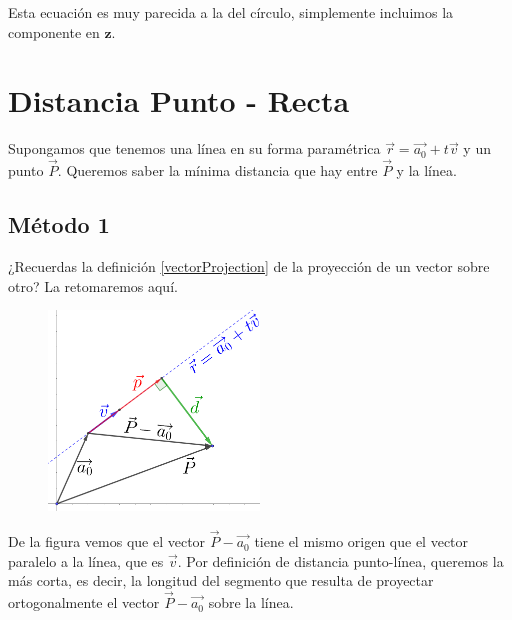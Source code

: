 \documentclass[12pt, fleqn]{report}                             %
\theoremstyle{break}                                            %
\newcommand{\lVec}[1]   {\overrightarrow{#1}}                   %
\begin{document}
            Esta ecuación es muy parecida a la del círculo, simplemente incluimos
            la componente en $\mathbf{z}$.
            


        \clearpage    
        \section{Distancia Punto - Recta}
        
            Supongamos que tenemos una línea en su forma paramétrica $\vec{r} = \lVec{a_0} + t\vec{v}$
            y un punto $\vec{P}$. Queremos saber la mínima distancia que hay entre $\vec{P}$ y la línea.
        

            \subsection{Método 1}
                
                ¿Recuerdas la definición \ref{vectorProjection} de la proyección de un vector sobre otro?
                La retomaremos aquí.
                
                \begin{figure}[H]
                    \centering
                    \includegraphics[width=0.5\textwidth]{distancePointLine}
                \end{figure}
            
                De la figura vemos que el vector $\vec{P} - \lVec{a_0}$ tiene el mismo origen que el
                vector paralelo a la línea, que es $\vec{v}$. Por definición de distancia punto-línea,
                queremos la más corta, es decir, la longitud del segmento que resulta de proyectar
                ortogonalmente el vector $\vec{P} - \lVec{a_0}$ sobre la línea.
                
\end{document}
